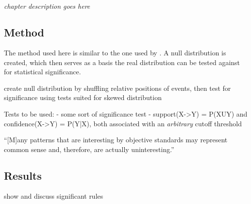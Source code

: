 
\chapter{\significance}
\label{ch:significance}
\emph{chapter description goes here}

\section{Method}
The method used here is similar to the one used by \citet[]{abuzhaya17}. A null distribution is created, which then serves as a basis the real distribution can be tested against for statistical significance.

create null distribution by shuffling relative positions of events, then test for significance using tests suited for skewed distribution

Tests to be used:
- some sort of significance test
- support(X->Y) = P(XUY) and confidence(X->Y) = P(Y|X), both associated with an \emph{arbitrary} cutoff threshold \citep[]{han12}

``[M]any patterns that are interesting by objective standards may represent common sense and, therefore, are actually uninteresting.'' \citep[]{han12}
\section{Results}
show and discuss significant rules